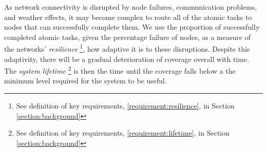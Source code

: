 As network connectivity is disrupted by node failures, communication problems, and weather effects, it may become complex to route all of the atomic tasks to nodes that can successfully complete them. We use the proportion of successfully completed atomic tasks, given the percentage failure of nodes, as a measure of the networks' \textit{resilience} \footnote{See definition of key requirements, \ref{requirement:resilience}, in Section \ref{section:background}}, how adaptive it is to these disruptions. Despite this adaptivity, there will be a gradual deterioration of coverage overall with time. The \textit{system lifetime} \footnote{See definition of key requirements, \ref{requirement:lifetime}, in Section \ref{section:background}} is then the time until the coverage falls below a the minimum level required for the system to be useful. 